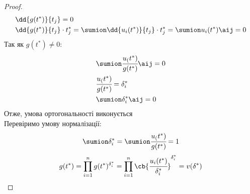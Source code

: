 \begin{proof}
\begin{eqnarray}
&\dd {g(t^\ast)}{t_j} = 0\\
&\dd {g(t^\ast)}{t_j}\cdot t_j^\ast = \sumion \dd{u_i(t^\ast)}{t_j} \cdot t_j^\ast = \sumion u_i(t^\ast) \aij = 0
\end{eqnarray}
Так як $g(t^\ast)\neq0$:
\begin{eqnarray}
&\sumion \cfrac{u_(t^\ast)}{g(t^\ast)} \aij = 0\\
&\cfrac{u_(t^\ast)}{g(t^\ast)} = \delta_i^\ast\\
&\sumion \delta_i^\ast \aij = 0
\end{eqnarray}
Отже, умова ортогональності виконується\\
Перевіримо умову нормалізації:\\
\begin{equation}
\sumion \delta_i^\ast = \sumion \cfrac{u_(t^\ast)}{g(t^\ast)} = 1
\end{equation}
\begin{eqnarray}
g(t^\ast) = \prod\limits_{i=1}^n g(t^\ast)^{\delta_i^\ast} = \prod\limits_{i=1}^n \cb{\cfrac{u_i(t^\ast)}{\delta_i^\ast}}^{\delta_i^\ast} = v(\delta^\ast)
\end{eqnarray}
\end{proof}